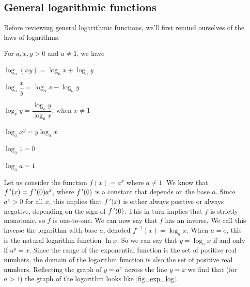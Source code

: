 \subsection{General logarithmic functions}

Before reviewing general logarithmic functions, we'll first remind ourselves of the laws of logarithms.

\begin{keyidea}\label{ki_log_laws}%
For $a,x,y>0$ and $a\ne1$, we have
\begin{enumext*}[columns=2]
\item$\log_a(xy)=\log_ax+\log_ay$
\item$\log_a\dfrac xy=\log_ax-\log_ay$\vspace{-.5ex}
\item$\log_xy=\dfrac{\log_ay}{\log_ax}$, when $x\ne1$
\item$\log_ax^y=y\log_ax$
\item$\log_a1=0$
\item$\log_aa=1$
\end{enumext*}
\end{keyidea}

Let us consider the function $f(x)=a^x$ where $a\neq1$. We know that $f\,'(x)=f\,'(0)a^x$, where $f\,'(0)$ is a constant that depends on the base $a$. Since $a^x>0$ for all $x$, this implies that $f\,'(x)$ is either always positive or always negative, depending on the sign of $f\,'(0)$. This in turn implies that $f$ is strictly monotonic, so $f$ is one-to-one. We can now say that $f$ has an inverse. We call this inverse the logarithm with base $a$, denoted $f^{-1}(x)=\log_ax$. When $a=e$, this is the natural logarithm function $\ln x$. So we can say that $y=\log_a x$ if and only if $a^y=x$. Since the range of the exponential function is the set of positive real numbers, the domain of the logarithm function is also the set of positive real numbers. Reflecting the graph of $y=a^x$ across the line $y=x$ we find that (for $a>1$) the graph of the logarithm looks like \autoref{fig_exp_log}.

